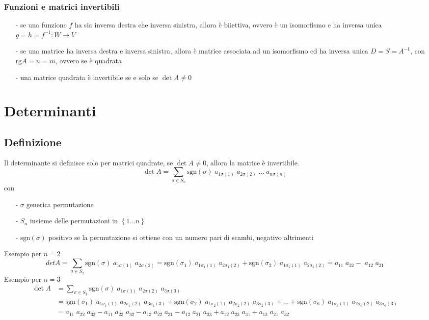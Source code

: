 \documentclass[a4paper]{article}
\newcommand\rg{\text{rg}} 		%
\newcommand\sgn{\text{sgn}}		%
\begin{document}
\subsubsection*{Funzioni e matrici invertibili}
\begin{itemize}[topsep=3pt, itemsep=0pt]
	\item[-] se una funzione \(f\) ha sia inversa destra che inversa sinistra, allora è biiettiva, ovvero è un isomorfismo e ha
	inversa unica \(g = h = f^{-1} : W \to V\)
	\item[-] se una matrice ha inversa destra e inversa sinistra, allora è matrice associata ad un isomorfismo ed ha inversa unica
	\(D = S = A^{-1}\), con \(\rg A = n = m\), ovvero se è quadrata
	\item[-] una matrice quadrata è invertibile se e solo se \(\det A \neq 0\)
\end{itemize}

\newpage

\section{Determinanti}
\subsection{Definizione}
Il determinante si definisce solo per matrici quadrate, se \(\det A \neq 0\), allora la matrice è invertibile.
\[\det A = \sum_{\sigma \in S_n} \sgn(\sigma) \; a_{1\sigma(1)} \; a_{2\sigma(2)} \; \dots \; a_{n\sigma(n)}\]
con \begin{itemize}[topsep=3pt, itemsep=0pt]
	\item[-] \(\sigma\) generica permutazione
	\item[-] \(S_n\) insieme delle permutazioni in \(\left\{ 1 \dots n \right\}\)
	\item[-] \(\sgn(\sigma)\) positivo se la permutazione si ottiene con un numero pari di scambi, negativo altrimenti
\end{itemize}
Esempio per \(n = 2\)
\[det A = \sum_{\sigma \in S_2} \sgn(\sigma) \; a_{1 \sigma(1)} \; a_{2 \sigma(2)} = \sgn(\sigma_1) \; a_{1 \sigma_1(1)} \; a_{2 \sigma_1(2)} + \sgn(\sigma_2) \; a_{1 \sigma_2(1)} \; a_{2 \sigma_2(2)} = a_{11} \; a_{22} -\; a_{12} \; a_{21}\]
Esempio per \(n = 3\)
\begin{align*}
	\det A &= \sum_{\sigma \in S_3} \sgn(\sigma) \; a_{1 \sigma(1)} \; a_{2 \sigma(2)} \; a_{3 \sigma(3)} \\
	&= \sgn(\sigma_1) \; a_{1 \sigma_1(1)} \; a_{2 \sigma_1(2)} \; a_{3 \sigma_1(3)} + \sgn(\sigma_2) \; a_{1 \sigma_2(1)} \; a_{2 \sigma_2(2)} \; a_{3 \sigma_2(3)} + \dots + \sgn(\sigma_6) \; a_{1 \sigma_6(1)} \; a_{2 \sigma_6(2)} \; a_{3 \sigma_6(3)} \\
	&= a_{11} \; a_{22} \; a_{33} - a_{11} \; a_{23} \; a_{32} - a_{13} \; a_{22} \; a_{31} - a_{12} \; a_{21} \; a_{33} + a_{12} \; a_{23} \; a_{31} + a_{13} \; a_{21} \; a_{32}
\end{align*}
\end{document}
